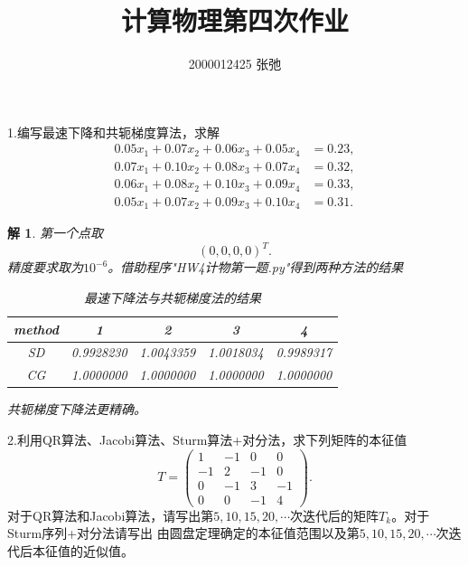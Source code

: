 \documentclass[10pt]{ctexart}
\author{2000012425 张弛}
\title{计算物理第四次作业}
\newtheorem*{solution}{解}
\begin{document}
\maketitle
1.编写最速下降和共轭梯度算法，求解
\begin{align}
    0.05x_1+0.07x_2+0.06x_3+0.05x_4&=0.23,\nonumber\\
    0.07x_1+0.10x_2+0.08x_3+0.07x_4&=0.32,\nonumber\\
    0.06x_1+0.08x_2+0.10x_3+0.09x_4&=0.33,\nonumber\\
    0.05x_1+0.07x_2+0.09x_3+0.10x_4&=0.31.\nonumber
\end{align}
\begin{solution}
    第一个点取
    $$(0,0,0,0)^T.$$
    精度要求取为$10^{-6}$。借助程序"HW4计物第一题.py"得到两种方法的结果
    \begin{table}[H]
        \centering
        \begin{tabular}{ccccc}
            \toprule
            method & 1 & 2 & 3 & 4\\
            \midrule
            SD & 0.9928230 & 1.0043359 & 1.0018034 & 0.9989317\\
            CG & 1.0000000 & 1.0000000 & 1.0000000 & 1.0000000\\
            \bottomrule
        \end{tabular}
        \caption{最速下降法与共轭梯度法的结果}
    \end{table}
    共轭梯度下降法更精确。
\end{solution}
2.利用QR算法、Jacobi算法、Sturm算法+对分法，求下列矩阵的本征值
$$T=
\begin{pmatrix}
    1 & -1 & 0 & 0\\
    -1 & 2 & -1 & 0\\
    0 & -1 & 3 & -1\\
    0 & 0 & -1 & 4
\end{pmatrix}.$$
对于QR算法和Jacobi算法，请写出第$5,10,15,20,\cdots$次迭代后的矩阵$T_k$。对于Sturm序列+对分法请写出
由圆盘定理确定的本征值范围以及第$5,10,15,20,\cdots$次迭代后本征值的近似值。
\end{document}
